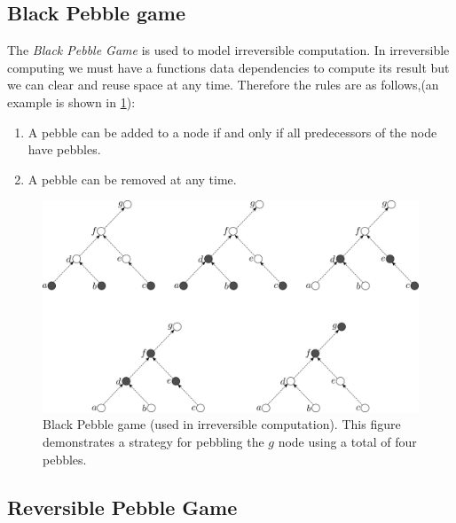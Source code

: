 
\subsection{Black Pebble game}

The \emph{Black Pebble Game} is used to model irreversible computation. In
irreversible computing we must have a functions data dependencies to compute
its result but we can clear and reuse space at any time. Therefore the rules
are as follows\cite{hopcroft1977},(an example is shown in \cref{fig:black-peb-game}):

\begin{enumerate}
  \item A pebble can be added to a node if and only if all predecessors of the
    node have pebbles.
  \item A pebble can be removed at any time.
\end{enumerate}

\begin{figure}
      \capstart
      \centering
      \includegraphics[width=0.9\hsize]{images/black-peb-game}

      \caption{Black Pebble game (used in irreversible computation). This figure demonstrates a strategy for
      pebbling the $g$ node using a total of four pebbles.}

      \label{fig:black-peb-game}
\end{figure}

\subsection{Reversible Pebble Game}

